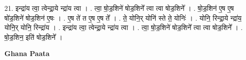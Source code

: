 \documentclass[17pt]{extarticle}
\begin{document}
21. इन्द्रा॑य त्वा॒ त्वेन्द्रा॒ये न्द्रा॑य त्वा । . त्वा॒ षो॒ड॒शिने॑ षोड॒शिने᳚ त्वा त्वा षोड॒शिने᳚ । . षो॒ड॒शिन॑ ए॒ष ए॒ष षो॑ड॒शिने॑ षोड॒शिन॑ ए॒षः । . ए॒ष ते॑ त ए॒ष ए॒ष ते᳚ । . ते॒ योनि॒र् योनि॑ स्ते ते॒ योनिः॑ । . योनि॒ रिन्द्रा॒ये न्द्रा॑य॒ योनि॒र् योनि॒ रिन्द्रा॑य । . इन्द्रा॑य त्वा॒ त्वेन्द्रा॒ये न्द्रा॑य त्वा । . त्वा॒ षो॒ड॒शिने॑ षोड॒शिने᳚ त्वा त्वा षोड॒शिने᳚ । . षो॒ड॒शिन॒ इति॑ षोड॒शिने᳚ । \newline

\textbf{Ghana Paata } \newline
\end{document}
